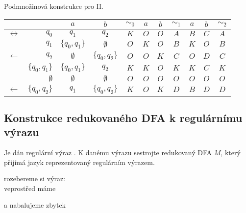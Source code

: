 Podmnožinová konstrukce pro II.

\begin{tabular}{|r r|c c||c|c c||c|c c||c|}
    \hline
    &  & $a$ & $b$ & $ \sim_0 $ & $a$ & $b$ & $\sim_1$ & $a$ & $b$ & $\sim_2$\\ \hline \hline
    $\leftrightarrow$& $q_0$          & $q_1$          & $q_2$          & $K$ & $O$ & $O$ & $A$ & $B$ & $C$ & $A$ \\
                     & $q_1$          & $\{q_0, q_1\}$ & $\emptyset$    & $O$ & $K$ & $O$ & $B$ & $K$ & $O$ & $B$ \\
              $\gets$& $q_2$          & $\emptyset$    & $\{q_0, q_2\}$ & $O$ & $O$ & $K$ & $C$ & $O$ & $D$ & $C$ \\
                     & $\{q_0, q_1\}$ & $\{q_0, q_1\}$ & $q_2$          & $K$ & $K$ & $O$ & $K$ & $K$ & $C$ & $K$ \\
                     & $\emptyset$    & $\emptyset$    & $\emptyset$    & $O$ & $O$ & $O$ & $O$ & $O$ & $O$ & $O$ \\
              $\gets$& $\{q_0, q_2\}$ & $q_1$          & $\{q_0, q_2\}$ & $K$ & $O$ & $K$ & $D$ & $B$ & $D$ & $D$ \\
    \hline
\end{tabular}

\subsection{Konstrukce redukovaného DFA k regulárnímu výrazu}
Je dán regulární výraz . K danému výrazu sestrojte redukovaný DFA $M$,
který přijímá jazyk reprezentovaný regulárním výrazem.

\begin{multicols}{2}
    rozebereme si výraz: \\
    veprostřed máme 


\columnbreak

    a nabalujeme zbytek


\end{multicols}

